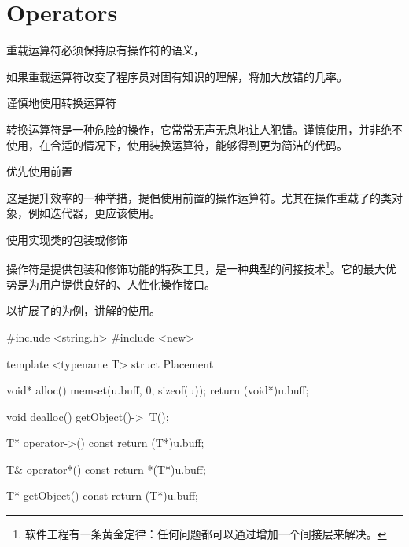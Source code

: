\section{Operators}

\begin{content}

\begin{regulation}
重载运算符必须保持原有操作符的语义，
\end{regulation}

如果重载运算符改变了程序员对固有知识的理解，将加大放错的几率。

\begin{regulation}
谨慎地使用转换运算符
\end{regulation}

转换运算符是一种危险的操作，它常常无声无息地让人犯错。谨慎使用，并非绝不使用，在合适的情况下，使用装换运算符，能够得到更为简洁的代码。

\begin{regulation}
优先使用前置
\end{regulation}

这是提升效率的一种举措，提倡使用前置的操作运算符。尤其在操作重载了的类对象，例如迭代器，更应该使用。

\begin{regulation}
使用实现类的包装或修饰
\end{regulation}

操作符是提供包装和修饰功能的特殊工具，是一种典型的间接技术\footnote{软件工程有一条黄金定律：任何问题都可以通过增加一个间接层来解决。}。它的最大优势是为用户提供良好的、人性化操作接口。

以扩展了的为例，讲解的使用。

\begin{leftbar}
\begin{c++}
#include <string.h>
#include <new>

template <typename T>
struct Placement
{
    void* alloc()
    {
        memset(u.buff, 0, sizeof(u));
        return (void*)u.buff;
    }

    void dealloc()
    {
        getObject()->~T();
    }    

    T* operator->() const
    {
        return (T*)u.buff;
    }

    T& operator*() const
    {
        return *(T*)u.buff;
    }

    T* getObject() const
    {
        return (T*)u.buff;
    }

}
\end{c++}
\end{leftbar}
\end{content}
